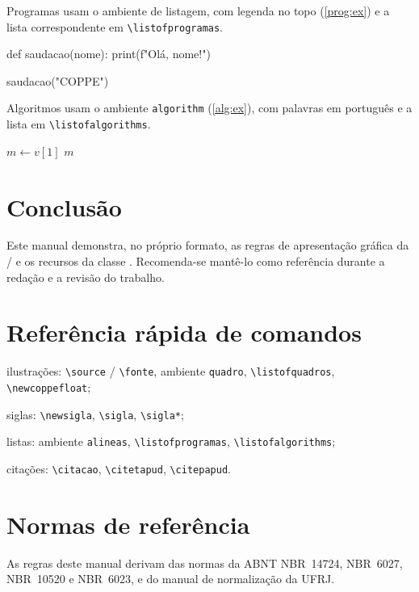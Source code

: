 \documentclass[dsc]{coppe}
\begin{document}
  Programas usam o ambiente de listagem, com legenda no topo (\autoref{prog:ex}) e
  a lista correspondente em \verb|\listofprogramas|.

  \begin{python}[caption={Olá, COPPE, em Python},label=prog:ex]
def saudacao(nome):
    print(f"Olá, {nome}!")

saudacao("COPPE")
  \end{python}

  Algoritmos usam o ambiente \verb|algorithm| (\autoref{alg:ex}), com palavras em
  português e a lista em \verb|\listofalgorithms|.

  \begin{algorithm}[H]
    \caption{Máximo de um vetor}
    \label{alg:ex}
    $m \leftarrow v[1]$\;
    \Retorna $m$\;
  \end{algorithm}

  \chapter{Conclusão}

  Este manual demonstra, no próprio formato, as regras de apresentação gráfica da
  / e os recursos da classe \CoppeTeX. Recomenda-se
  mantê-lo como referência durante a redação e a revisão do trabalho.

  \appendix

  \chapter{Referência rápida de comandos}

  \begin{alineas}
    \item ilustrações: \verb|\source| / \verb|\fonte|, ambiente \verb|quadro|,
      \verb|\listofquadros|, \verb|\newcoppefloat|;
    \item siglas: \verb|\newsigla|, \verb|\sigla|, \verb|\sigla*|;
    \item listas: ambiente \verb|alineas|, \verb|\listofprogramas|,
      \verb|\listofalgorithms|;
    \item citações: \verb|\citacao|, \verb|\citetapud|, \verb|\citepapud|.
  \end{alineas}

  \annex

  \chapter{Normas de referência}

  As regras deste manual derivam das normas da ABNT \mbox{NBR~14724},
  \mbox{NBR~6027}, \mbox{NBR~10520} e \mbox{NBR~6023}, e do manual de
  normalização da UFRJ.

  \backmatter
  \printbibliography
\end{document}
